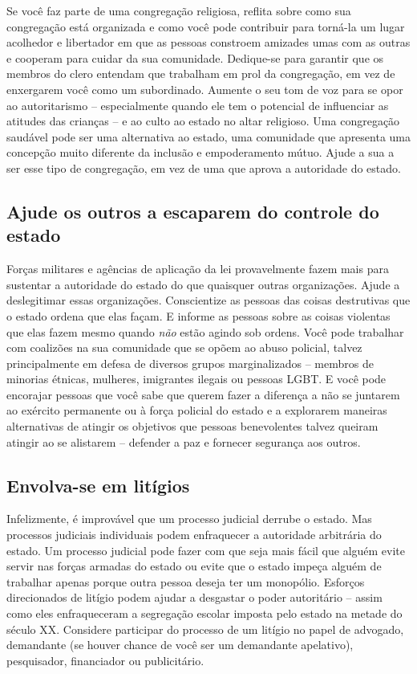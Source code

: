 Se você faz parte de uma congregação religiosa, reflita sobre como sua congregação está organizada e como você pode contribuir para torná-la um lugar acolhedor e libertador em que as pessoas constroem amizades umas com as outras e cooperam para cuidar da sua comunidade. Dedique-se para garantir que os membros do clero entendam que trabalham em prol da congregação, em vez de enxergarem você como um subordinado. Aumente o seu tom de voz para se opor ao autoritarismo -- especialmente quando ele tem o potencial de influenciar as atitudes das crianças -- e ao culto ao estado no altar religioso. Uma congregação saudável pode ser uma alternativa ao estado, uma comunidade que apresenta uma concepção muito diferente da inclusão e empoderamento mútuo. Ajude a sua a ser esse tipo de congregação, em vez de uma que aprova a autoridade do estado.

\subsection*{Ajude os outros a escaparem do controle do estado}

Forças militares e agências de aplicação da lei provavelmente fazem mais para sustentar a autoridade do estado do que quaisquer outras organizações. Ajude a deslegitimar essas organizações. Conscientize as pessoas das coisas destrutivas que o estado ordena que elas façam. E informe as pessoas sobre as coisas violentas que elas fazem mesmo quando \emph{não} estão agindo sob ordens. Você pode trabalhar com coalizões na sua comunidade que se opõem ao abuso policial, talvez principalmente em defesa de diversos grupos marginalizados -- membros de minorias étnicas, mulheres, imigrantes ilegais ou pessoas LGBT. E você pode encorajar pessoas que você sabe que querem fazer a diferença a não se juntarem ao exército permanente ou à força policial do estado e a explorarem maneiras alternativas de atingir os objetivos que pessoas benevolentes talvez queiram atingir ao se alistarem -- defender a paz e fornecer segurança aos outros.

\subsection*{Envolva-se em litígios}

Infelizmente, é improvável que um processo judicial derrube o estado. Mas processos judiciais individuais podem enfraquecer a autoridade arbitrária do estado. Um processo judicial pode fazer com que seja mais fácil que alguém evite servir nas forças armadas do estado ou evite que o estado impeça alguém de trabalhar apenas porque outra pessoa deseja ter um monopólio. Esforços direcionados de litígio podem ajudar a desgastar o poder autoritário -- assim como eles enfraqueceram a segregação escolar imposta pelo estado na metade do século XX. Considere participar do processo de um litígio no papel de advogado, demandante (se houver chance de você ser um demandante apelativo), pesquisador, financiador ou publicitário.

